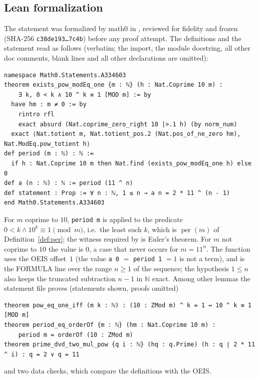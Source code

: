 \documentclass[11pt]{amsart}
\theoremstyle{plain}
\theoremstyle{definition}
\newcommand{\N}{\mathbb{N}}
\newcommand{\per}{\operatorname{per}}
\begin{document}
\subsection*{Lean formalization}
The statement was formalized by math0 in , reviewed for fidelity and frozen (SHA-256 \texttt{c38de193\ldots 7c4b}) before any proof attempt. The definitions and the statement read as follows (verbatim; the import, the module docstring, all other doc comments, blank lines and all other declarations are omitted):
\begin{lstlisting}
namespace Math0.Statements.A334603
theorem exists_pow_modEq_one {m : ℕ} (h : Nat.Coprime 10 m) :
    ∃ k, 0 < k ∧ 10 ^ k ≡ 1 [MOD m] := by
  have hm : m ≠ 0 := by
    rintro rfl
    exact absurd (Nat.coprime_zero_right 10 |>.1 h) (by norm_num)
  exact ⟨Nat.totient m, Nat.totient_pos.2 (Nat.pos_of_ne_zero hm), Nat.ModEq.pow_totient h⟩
def period (m : ℕ) : ℕ :=
  if h : Nat.Coprime 10 m then Nat.find (exists_pow_modEq_one h) else 0
def a (n : ℕ) : ℕ := period (11 ^ n)
def statement : Prop := ∀ n : ℕ, 1 ≤ n → a n = 2 * 11 ^ (n - 1)
end Math0.Statements.A334603
\end{lstlisting}
For $m$ coprime to $10$, \texttt{period m} is  applied to the predicate $0<k\wedge 10^k\equiv1\pmod m$, i.e.\ the least such $k$, which is $\per(m)$ of Definition~\ref{def:per}; the witness required by  is Euler's theorem. For $m$ not coprime to $10$ the value is $0$, a case that never occurs for $m=11^n$. The function  uses the OEIS offset~$1$ (the value \texttt{a 0} $=$ \texttt{period 1} $=1$ is not a term), and  is the FORMULA line over the range $n\ge1$ of the sequence; the hypothesis $1\le n$ also keeps the truncated subtraction $n-1$ in $\N$ exact.
Among other lemmas the statement file proves (statements shown, proofs omitted)
\begin{lstlisting}
theorem pow_eq_one_iff (m k : ℕ) : (10 : ZMod m) ^ k = 1 ↔ 10 ^ k ≡ 1 [MOD m]
theorem period_eq_orderOf {m : ℕ} (hm : Nat.Coprime 10 m) :
    period m = orderOf (10 : ZMod m)
theorem prime_dvd_two_mul_pow {q i : ℕ} (hq : q.Prime) (h : q ∣ 2 * 11 ^ i) : q = 2 ∨ q = 11
\end{lstlisting}
and two data checks, which compare the definitions with the OEIS.
\end{document}
